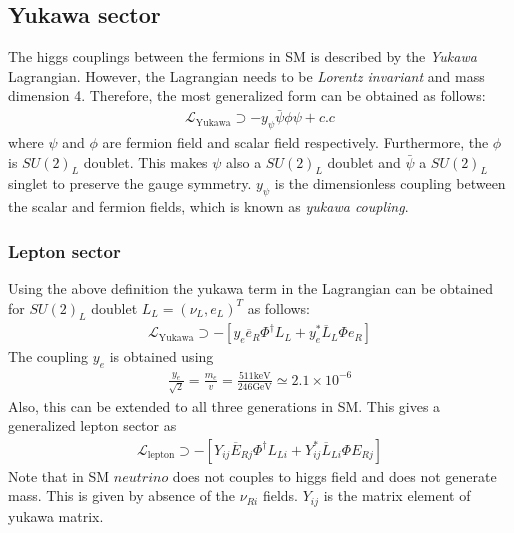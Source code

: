 \subsection{Yukawa sector}
The higgs couplings between the fermions in SM is described by the \textit{Yukawa} Lagrangian. However, the Lagrangian needs to be \textit{Lorentz invariant} and mass dimension 4. Therefore, the most generalized form can be obtained as follows:
\begin{eqnarray}
\mathcal{L}_{\mathrm{Yukawa}} \supset -y_{\psi}\bar{\psi}\phi\psi+ c.c
\end{eqnarray} 
where $\psi$ and $\phi$ are fermion field and scalar field respectively. Furthermore, the $\phi$ is $SU(2)_L$ doublet. This makes $\psi$ also a $SU(2)_L$ doublet and $\bar{\psi}$ a $SU(2)_L$ singlet to preserve the gauge symmetry. $y_{\psi}$ is the dimensionless coupling between the scalar and fermion fields, which is known as \textit{yukawa coupling}.
\subsubsection{Lepton sector}
Using the above definition the yukawa term in the Lagrangian can be obtained for  $SU(2)_L$ doublet $L_{L}=\left(\nu_{L}, e_{L}\right)^{T}$ as follows:
\begin{eqnarray}
\mathcal{L}_{\mathrm{Yukawa}} \supset-\left[y_{e} \overline{e}_{R} \Phi^{\dagger} L_{L}+y_{e}^{*} \overline{L}_{L} \Phi e_{R}\right]
\end{eqnarray}
The coupling $y_{e}$ is obtained using
\begin{eqnarray}
\frac{y_{e}}{\sqrt{2}}=\frac{m_{e}}{v}=\frac{511 \mathrm{keV}}{246 \mathrm{GeV}} \simeq 2.1 \times 10^{-6}
\end{eqnarray} 	
Also, this can be extended to all three generations in SM. This gives a generalized lepton sector as
\begin{eqnarray}
\mathcal{L}_{\mathrm{lepton}} \supset-\left[Y_{ij} \overline{E}_{Rj} \Phi^{\dagger} L_{Li}+Y_{ij}^{*} \overline{L}_{Li} \Phi E_{Rj}\right]
\end{eqnarray} 
Note that in SM $neutrino$ does not couples to higgs field and does not generate mass. This is given by absence of the $\nu_{Ri}$ fields. $Y_{ij}$ is the matrix element of yukawa matrix.
